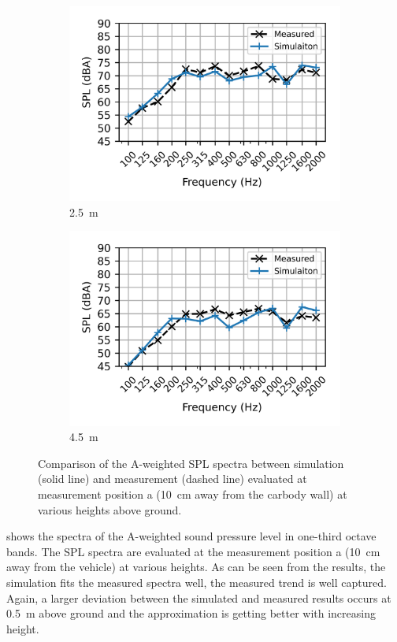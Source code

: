 \begin{figure}
\begin{subfigure}[b]{0.49\textwidth}
		\centering
		\includegraphics{fig/chap5/initial_model/freq_spectrum/pos_10cm_2pt5m.png}
		\caption{\SI{2.5}{\meter}}
	\end{subfigure}
	\hfill
	\begin{subfigure}[b]{0.49\textwidth}
		\centering
		\includegraphics{fig/chap5/initial_model/freq_spectrum/pos_10cm_4pt5m.png}
		\caption{\SI{4.5}{\meter}}
	\end{subfigure}
	\caption{Comparison of the A-weighted SPL spectra between simulation (solid line) and measurement (dashed line) evaluated at measurement position a (\SI{10}{\centi\meter} away from the carbody wall) at various heights above ground.}
	\label{fig:freq_spectrum}
\end{figure}
%
 shows the spectra of the A-weighted sound pressure level in one-third octave bands. The SPL spectra are evaluated at the measurement position a (\SI{10}{\centi\meter} away from the vehicle) at various heights. As can be seen from the results, the simulation fits the measured spectra well, the measured trend is well captured. Again, a larger deviation between the simulated and measured results occurs at \SI{0.5}{\meter} above ground and the approximation is getting better with increasing height.

